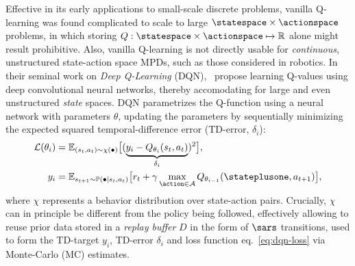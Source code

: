 Effective in its early applications to small-scale discrete problems, vanilla Q-learning was found complicated to scale to large \( \statespace \times \actionspace \) problems, in which storing \( Q : \statespace \times \actionspace \mapsto \mathbb R \) alone might result prohibitive. 
Also, vanilla Q-learning is not directly usable for \emph{continuous}, unstructured state-action space MPDs, such as those considered in robotics.
In their seminal work on \emph{Deep Q-Learning} (DQN),~\citet{mnihPlayingAtariDeep2013} propose learning Q-values using deep convolutional neural networks, thereby accomodating for large and even unstructured \emph{state} spaces.
DQN parametrizes the Q-function using a neural network with parameters \( \theta \), updating the parameters by sequentially minimizing the expected squared temporal-difference error (TD-error, \( \delta_i \)):
\begin{align}
\mathcal L(\theta_i) &= \mathbb E_{(s_t, a_t) \sim \chi(\bullet)} 
    \big[ 
        (\underbrace{y_i - Q_{\theta_i}(s_t, a_t)}_{\delta_i})^2 
    \big], \label{eq:dqn-loss} \\
    y_i &= \mathbb E_{s_{t+1} \sim \mathbb P(\bullet \vert s_t, a_t)} \big[ r_t + \gamma \max_{\action \in \mathcal A} Q_{\theta_{i-1}} (\stateplusone, a_{t+1}) \big], \label{eq:TD-target}
\end{align}
where \( \chi \) represents a behavior distribution over state-action pairs. 
Crucially, \( \chi \) can in principle be different from the policy being followed, effectively allowing to reuse prior data stored in a \emph{replay buffer} \( D \) in the form of \( \sars \) transitions, used to form the TD-target \( y_i \), TD-error \( \delta_i \) and loss function eq.~\ref{eq:dqn-loss} via Monte-Carlo (MC) estimates.


